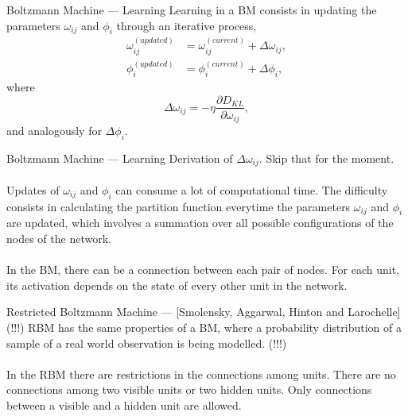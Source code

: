 \begin{frame}{Boltzmann Machine --- Learning}
    \justifying%
    Learning in a BM consists in updating the parameters $\omega_{ij}$ and $\phi_{i}$ through an iterative process,
    \begin{align}
        \label{eq:omega-update-1}
        \omega^{(updated)}_{ij} &= \omega^{(current)}_{ij} + \Delta \omega_{ij}, \\
        \phi^{(updated)}_{i} &= \phi^{(current)}_{i} + \Delta \phi_{i},
    \end{align}
    where 
    \begin{equation}
        \label{eq:delta-omega}
        \Delta \omega_{ij} = -\eta \frac{\partial D_{KL}}{\partial \omega_{ij}},
    \end{equation}
    and analogously for $\Delta \phi_{i}$.
\end{frame}


\begin{frame}{Boltzmann Machine --- Learning}
    \justifying%
    Derivation of $\Delta \omega_{ij}$. Skip that for the moment. \Laughey[1.5]
    \\~\\
    Updates of $\omega_{ij}$ and $\phi_{i}$ can consume a lot of computational time. 
    The difficulty consists in calculating the partition function everytime the parameters $\omega_{ij}$ and $\phi_{i}$ are updated, which involves a summation over all possible configurations of the nodes of the network. \Xey[1.5]
    \\~\\
    In the BM, there can be a connection between each pair of nodes. For each unit, its activation depends on the state of every other unit in the network.
\end{frame}


\begin{frame}{Restricted Boltzmann Machine --- [Smolensky, Aggarwal, Hinton and Larochelle]}
    \justifying%
    (!!!) RBM has the same properties of a BM, where a probability distribution of a sample of a real world observation is being modelled. (!!!)
    \\~\\
    In the RBM there are restrictions in the connections among units. There are no connections among two visible units or two hidden units. Only connections between a visible and a hidden unit are allowed.
\end{frame}

